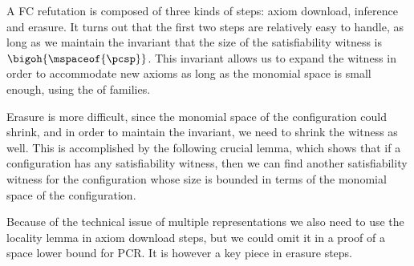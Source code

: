\documentclass[11pt]{article}
\numberwithin{equation}{section}
\theoremstyle{definition}
\theoremstyle{plain}
\begin{document}
A FC refutation is composed of three kinds of steps: axiom download, inference and erasure. It turns out that the first two steps are relatively easy to handle, as long as we maintain the invariant that the size of the satisfiability witness is $\bigoh{\mspaceof{\pcsp}}$. This invariant allows us to expand the witness in order to accommodate new axioms as long as the monomial space is small enough, using the \extensionproperty of \kextendibleNok families.

Erasure is more difficult, since the monomial space of the configuration could shrink, and in order to maintain the invariant, we need to shrink the witness as well. This is accomplished by the following crucial lemma, which shows that if a configuration has any satisfiability witness, then we can find another satisfiability witness for the configuration whose size is bounded in terms of the monomial space of the configuration.

Because of the technical issue of multiple representations we also need to use the locality lemma in axiom download steps, but we could omit it in a proof of a space lower bound for PCR. It is however a key piece in erasure steps.
\end{document}
